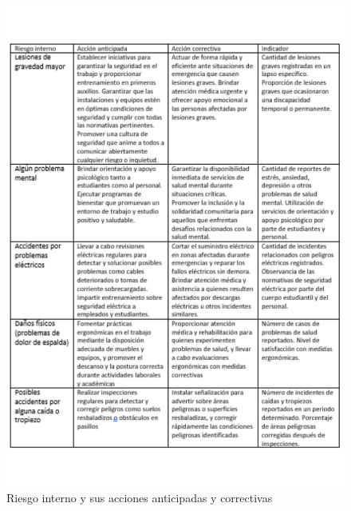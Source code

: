     \begin{figure}[H]
        \centering
        \includegraphics[scale=0.25]{30/img/TablotaDeRiesgosint.pdf}
        \caption{Riesgo interno y sus acciones anticipadas y correctivas}
    \end{figure}
